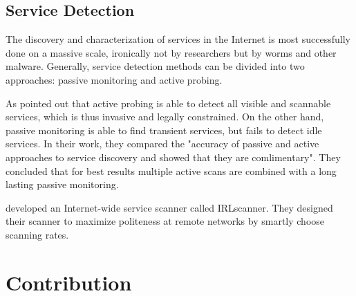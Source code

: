 
\subsection{Service Detection} 
The discovery and characterization of services in the Internet is most successfully done on a massive scale, ironically not by researchers but by worms and other malware\citep{Chen:2007}. Generally, service detection methods can be divided into two approaches: passive monitoring and active probing. 

As \citet{Bartlett07b} pointed out that active probing is able to detect all visible and scannable services, which is thus invasive and legally constrained. On the other hand, passive monitoring is able to find transient services, but fails to detect idle services. In their work, they compared the "accuracy of passive and active approaches to service discovery and showed that they are comlimentary"\citep{Bartlett07b}. They concluded that for best results multiple active scans are combined with a long lasting passive monitoring. 

\citet{Leonard:2010} developed an Internet-wide service scanner called IRLscanner. They designed their scanner to maximize politeness at remote networks by smartly choose scanning rates. 

\section{Contribution\label{sec:contribution}}


